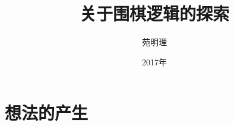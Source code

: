 \documentclass[a4paper,10.5pt]{article}
\title{关于围棋逻辑的探索}
\author{苑明理}
\date{2017年}
\begin{document}
\maketitle{}
\renewcommand\contentsname{目录}
\setcounter{tocdepth}{2}
\tableofcontents

\newpage


\section{想法的产生}

\end{document}
